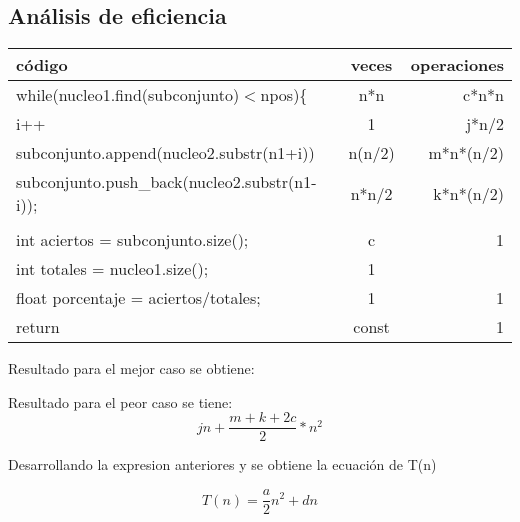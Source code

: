 \documentclass{article}
\begin{document}
\begin{itemize}
\section{Análisis de eficiencia}

\begin{center}
\begin{tabular}{|l|c|r|}
\hline
código & veces & operaciones\\
\hline
while(nucleo1.find(subconjunto)$<$npos)\{ & n*n & c*n*n \\
i++ & 1 & j*n/2 \\
subconjunto.append(nucleo2.substr(n1+i)) & n(n/2) & m*n*(n/2)\\
subconjunto.push\_back(nucleo2.substr(n1-i));& n*n/2 & k*n*(n/2)\\
}\\
int aciertos = subconjunto.size(); & c & 1 \\
int totales  = nucleo1.size(); & 1 & \\
float porcentaje = aciertos/totales;  & 1 & 1 \\
return & const & 1\\
\hline
\end{tabular}
\end{center}

Resultado para el mejor caso se obtiene: \\

\begin{equation}
\label{eq:best}

\end{equation}


Resultado para el peor caso se tiene:\\

\begin{equation}
\label{eq:worst}
jn + \frac{m+k+2c}{2}*n^2
\end{equation}

Desarrollando la expresion anteriores y se obtiene la ecuación de T(n)

\begin{equation}
\label{eq:T(n)}
T(n)=\frac{a}{2}n^2 + dn 
\end{equation}


\end{itemize}
\end{document}
